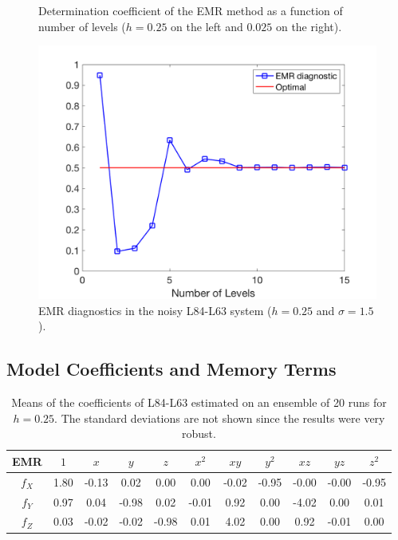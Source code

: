 \documentclass[12pt]{article}
\begin{document}
\begin{figure}[H]
\begin{subfigure}[b]{0.49\textwidth}
	\end{subfigure}
	\caption{\label{convergence emr}Determination coefficient of the EMR method as a function of number of levels ($h=0.25$ on the left and $0.025$ on the right).}
\end{figure}




\begin{figure}[H]
	\centering
	\includegraphics[width=\textwidth]{plots/l84l63/emr_diagnostics_noise.png}
	\caption{\label{convergence with noise}EMR diagnostics in the noisy L84-L63 system ($h=0.25$ and $\sigma = 1.5$).}
\end{figure}


\subsection{Model Coefficients and Memory Terms}

\begin{table}[H]
	\centering
	\begin{tabular}{c | cccccccccc}
		EMR & $1$ & $x$ & $y$ & $z$ & $x^2$ & $xy$ & $y^2$ & $xz$ & $yz$ & $z^2$  \\ \hline
		$f_X$ & \hphantom{-}1.80 & -0.13 & \hphantom{-}0.02 & \hphantom{-}0.00 & \hphantom{-}0.00 & -0.02 & -0.95 & -0.00 & -0.00 & -0.95\\
		$f_Y$ & \hphantom{-}0.97& \hphantom{-}0.04 & -0.98 & \hphantom{-}0.02 & -0.01 & \hphantom{-}0.92 & \hphantom{-}0.00& -4.02 & \hphantom{-}0.00 & \hphantom{-}0.01 \\ 
		$f_Z$ & \hphantom{-}0.03 & -0.02 & -0.02& -0.98 &\hphantom{-}0.01& \hphantom{-}4.02 & \hphantom{-}0.00 & \hphantom{-}0.92 & -0.01 & \hphantom{-}0.00 \\ 
	\end{tabular}
	\caption{Means of the coefficients of L84-L63 estimated on an ensemble of 20 runs for $h=0.25$. The standard deviations are not shown since the results were very robust.}
\end{table}
\end{document}
